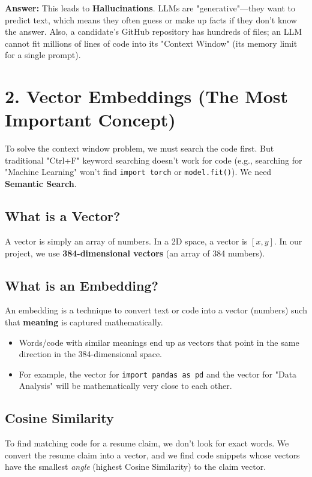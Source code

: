 \documentclass[12pt,a4paper]{article}
\begin{document}
\begin{tcolorbox}[colback=red!5!white,colframe=red!75!black,title=Common Question: Why don't we just ask ChatGPT to read the resume and the code directly?]
\textbf{Answer:} This leads to \textbf{Hallucinations}. LLMs are "generative"—they want to predict text, which means they often guess or make up facts if they don't know the answer. Also, a candidate's GitHub repository has hundreds of files; an LLM cannot fit millions of lines of code into its "Context Window" (its memory limit for a single prompt).
\end{tcolorbox}

\section{2. Vector Embeddings (The Most Important Concept)}
To solve the context window problem, we must search the code first. But traditional "Ctrl+F" keyword searching doesn't work for code (e.g., searching for "Machine Learning" won't find \texttt{import torch} or \texttt{model.fit()}). We need \textbf{Semantic Search}.

\subsection{What is a Vector?}
A vector is simply an array of numbers. In a 2D space, a vector is $[x, y]$. In our project, we use \textbf{384-dimensional vectors} (an array of 384 numbers).

\subsection{What is an Embedding?}
An embedding is a technique to convert text or code into a vector (numbers) such that \textbf{meaning} is captured mathematically. 
\begin{itemize}
    \item Words/code with similar meanings end up as vectors that point in the same direction in the 384-dimensional space.
    \item For example, the vector for \texttt{import pandas as pd} and the vector for "Data Analysis" will be mathematically very close to each other.
\end{itemize}

\subsection{Cosine Similarity}
To find matching code for a resume claim, we don't look for exact words. We convert the resume claim into a vector, and we find code snippets whose vectors have the smallest \textit{angle} (highest Cosine Similarity) to the claim vector.
\end{document}
